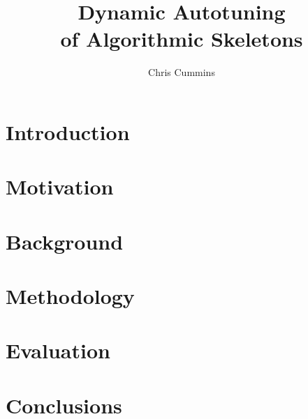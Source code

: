 
\title{Dynamic Autotuning\\of Algorithmic Skeletons}

\author{Chris Cummins}







\chapter{Introduction}\label{chap:introduction}


\chapter{Motivation}\label{chap:motivation}


\chapter{Background}\label{chap:background}


\chapter{Methodology}\label{chap:methodology}


\chapter{Evaluation}\label{chap:evaluation}


\chapter{Conclusions}\label{chap:conclusions}


\label{bibliography}
\printbibliography


